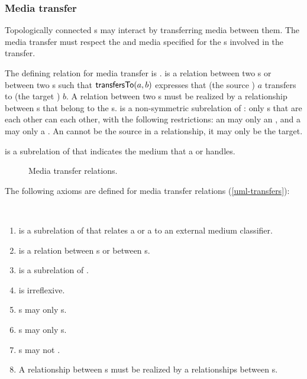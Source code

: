\subsubsection{Media transfer}
\label{sec:media-transfer}

Topologically connected s may interact by transferring media
between them.  The media transfer must respect the  and
media specified for the s involved in the transfer.

The defining relation for media transfer is .
%
 is a relation between two s or between
two s such that $\textsf{transfersTo}(a,b)$ expresses that (the
source ) $a$ transfers to (the target ) $b$.
%
A  relation between two s must be
realized by a  relationship between s
that belong to the s.
%
 is a non-symmetric subrelation of :
only s that are  each other can
 each other, with the following restrictions:
%
an  may only  an
, and a  may only  a
. An  cannot be the source
 in a  relationship, it may only be the target.

 is a subrelation of  that indicates the
medium that a  or  handles.

\begin{figure}
\centering

\caption{\label{uml-transfers}
  Media transfer relations.}
\end{figure}

The following axioms are defined for media transfer relations (\autoref{uml-transfers}):
\begin{axioms}~
  \begin{enumerate}[resume=axioms,{label=(\arabic*)}]
  \item {} is a subrelation of  that relates a
     or a  to an external medium classifier.
  \item {} is a relation between s or between s.
  \item {} is a subrelation of .
  \item {} is irreflexive.
  \item {}s may only  s.
  \item {}s may only  s.
  \item {}s may not .
  \item A  relationship between s must be
    realized by a  relationships between
    s.
  \end{enumerate}
\end{axioms}


